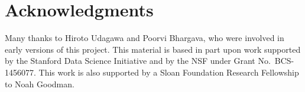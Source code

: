 \documentclass[11pt,a4paper]{article}
\begin{document}
\section*{Acknowledgments}

Many thanks to Hiroto Udagawa and Poorvi Bhargava, who were involved in early versions of this project. This material is based in part upon work supported by the Stanford Data Science Initiative and by the NSF under Grant No.~BCS-1456077. This work is also supported by a Sloan Foundation Research Fellowship to Noah Goodman.





\appendix
\end{document}
